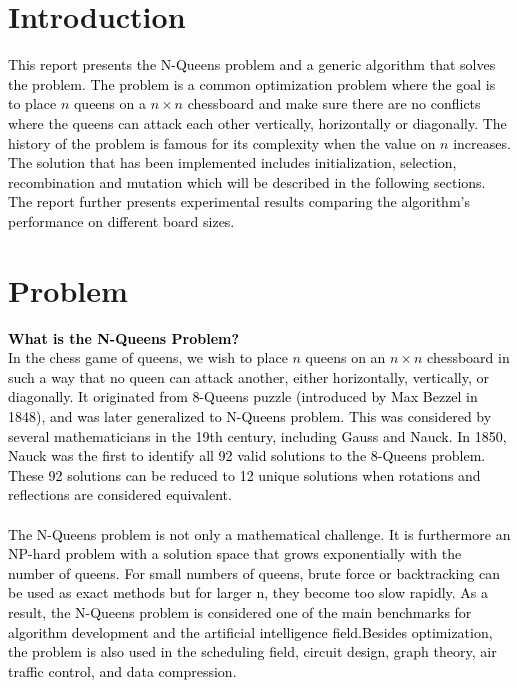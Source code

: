 \documentclass{scrartcl}
\title{\reportname}
\subtitle{An Evolutionary Algorithm for the N-Queen problem}
\author{Sandra Carlsson\quad Besan Ewir \\ Eddie Olofsgård\quad Ebba Brage}
\date{\today}
\begin{document}
\maketitle



\section{Introduction}
\label{sec:intro}

\textcolor{black}{This report presents the N-Queens problem and a generic algorithm that solves the problem. The problem is a common optimization problem where the goal is to place $n$ queens on a $n \times n$ chessboard and make sure there are no conflicts where the queens can attack each other vertically, horizontally or diagonally. The history of the problem is famous for its complexity when the value on $n$ increases. The solution that has been implemented includes initialization, selection, recombination and mutation which will be described in the following sections. The report further presents experimental results comparing the algorithm’s performance on different board sizes.}


\section{Problem}
\label{sec:problem_description}
\textcolor{black}{\textbf{What is the N-Queens Problem?\\} In the chess game of queens, we wish to place $n$ queens on an $n \times n$ chessboard in such a way that no queen can attack another, either horizontally, vertically, or diagonally. It originated from 8-Queens puzzle (introduced by Max Bezzel in 1848), and was later generalized to N-Queens problem. This was considered by several mathematicians in the 19th century, including Gauss and Nauck. In 1850, Nauck was the first to identify all 92 valid solutions to the 8-Queens problem. These 92 solutions can be reduced to 12 unique solutions when rotations and reflections are considered equivalent. \\ \\ The N-Queens problem is not only a mathematical challenge. It is furthermore an NP-hard problem with a solution space that grows exponentially with the number of queens. For small numbers of queens, brute force or backtracking can be used as exact methods but for larger n, they become too slow rapidly. As a result, the N-Queens problem is considered one of the main benchmarks for algorithm development and the artificial intelligence field.Besides optimization, the problem is also used in the scheduling field, circuit design, graph theory, air traffic control, and data compression.}
\end{document}

